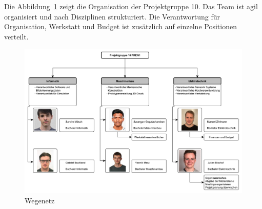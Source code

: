 \documentclass[../main.tex]{subfiles}
\begin{document}
Die Abbildung~\ref{fig:Organigramm} zeigt die Organisation der Projektgruppe
10. Das Team ist agil organisiert und nach Disziplinen strukturiert. Die
Verantwortung für Organisation, Werkstatt und Budget ist zusätzlich auf
einzelne Positionen verteilt.

\begin{figure}[h!]
    \centering
    \includegraphics[page=1, width=1\textwidth]{../resources/Organigramm.pdf}
    \caption{Wegenetz}\label{fig:Organigramm}
\end{figure}
\end{document}
